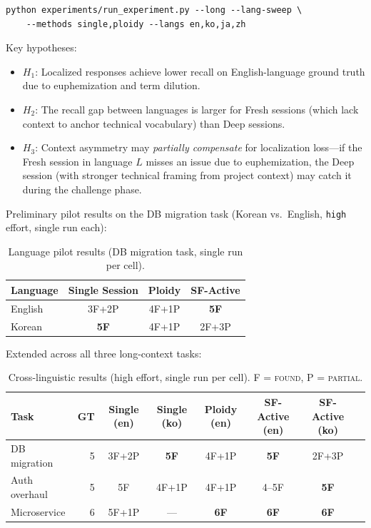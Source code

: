 \documentclass[11pt]{article}
\begin{document}
\begin{lstlisting}
python experiments/run_experiment.py --long --lang-sweep \
    --methods single,ploidy --langs en,ko,ja,zh
\end{lstlisting}

Key hypotheses:
\begin{itemize}[leftmargin=1.5em]
  \item $H_1$: Localized responses achieve lower recall on English-language ground truth due to euphemization and term dilution.
  \item $H_2$: The recall gap between languages is larger for Fresh sessions (which lack context to anchor technical vocabulary) than Deep sessions.
  \item $H_3$: Context asymmetry may \emph{partially compensate} for localization loss---if the Fresh session in language $L$ misses an issue due to euphemization, the Deep session (with stronger technical framing from project context) may catch it during the challenge phase.
\end{itemize}

Preliminary pilot results on the DB migration task (Korean vs.\ English, \texttt{high} effort, single run each):

\begin{table}[H]
\centering
\caption{Language pilot results (DB migration task, single run per cell).}
\label{tab:lang-pilot}
\small
\begin{tabular}{@{}lccc@{}}
\toprule
\textbf{Language} & \textbf{Single Session} & \textbf{Ploidy} & \textbf{SF-Active} \\
\midrule
English & 3F+2P & 4F+1P & \textbf{5F} \\
Korean  & \textbf{5F}    & 4F+1P & 2F+3P \\
\bottomrule
\end{tabular}
\end{table}

\noindent Extended across all three long-context tasks:

\begin{table}[H]
\centering
\caption{Cross-linguistic results (high effort, single run per cell). F = \textsc{found}, P = \textsc{partial}.}
\label{tab:lang-full}
\small
\begin{tabular}{@{}lr cccccc@{}}
\toprule
\textbf{Task} & \textbf{GT} & \textbf{Single (en)} & \textbf{Single (ko)} & \textbf{Ploidy (en)} & \textbf{SF-Active (en)} & \textbf{SF-Active (ko)} \\
\midrule
DB migration   & 5 & 3F+2P & \textbf{5F}  & 4F+1P & \textbf{5F} & 2F+3P \\
Auth overhaul  & 5 & 5F    & 4F+1P        & 4F+1P & 4--5F       & \textbf{5F} \\
Microservice   & 6 & 5F+1P & ---          & \textbf{6F}    & \textbf{6F} & \textbf{6F} \\
\bottomrule
\end{tabular}
\end{table}
\end{document}
